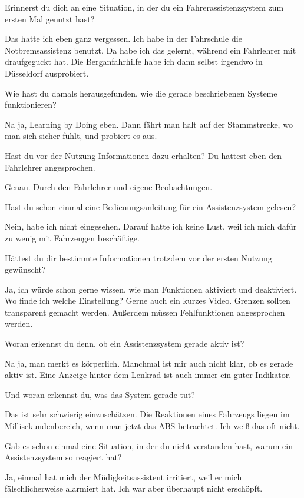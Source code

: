 \interviewerin
Erinnerst du dich an eine Situation, in der du ein
Fahrerassistenzsystem zum ersten Mal genutzt hast?

Das hatte ich eben ganz vergessen. Ich habe in der Fahrschule die
Notbremsassistenz benutzt. Da habe ich das gelernt, während ein
Fahrlehrer mit draufgeguckt hat. Die Berganfahrhilfe habe ich dann
selbst irgendwo in Düsseldorf ausprobiert.

\interviewerin
Wie hast du damals herausgefunden, wie die gerade beschriebenen Systeme
funktionieren?

Na ja, Learning by Doing eben. Dann fährt man halt auf der Stammstrecke,
wo man sich sicher fühlt, und probiert es aus.

\interviewerin
Hast du vor der Nutzung Informationen dazu erhalten? Du hattest eben
den Fahrlehrer angesprochen.

Genau. Durch den Fahrlehrer und eigene Beobachtungen.

\interviewerin
Hast du schon einmal eine Bedienungsanleitung für ein Assistenzsystem
gelesen?

Nein, habe ich nicht eingesehen. Darauf hatte ich keine Lust, weil ich
mich dafür zu wenig mit Fahrzeugen beschäftige.

\interviewerin
Hättest du dir bestimmte Informationen trotzdem vor der ersten Nutzung
gewünscht?

Ja, ich würde schon gerne wissen, wie man Funktionen aktiviert und
deaktiviert. Wo finde ich welche Einstellung? Gerne auch ein kurzes
Video. Grenzen sollten transparent gemacht werden. Außerdem müssen
Fehlfunktionen angesprochen werden.

\interviewerin
Woran erkennst du denn, ob ein Assistenzsystem gerade aktiv ist?

Na ja, man merkt es körperlich. Manchmal ist mir auch nicht klar, ob es
gerade aktiv ist. Eine Anzeige hinter dem Lenkrad ist auch immer ein
guter Indikator.

\interviewerin
Und woran erkennst du, was das System gerade tut?

Das ist sehr schwierig einzuschätzen. Die Reaktionen eines Fahrzeugs
liegen im Millisekundenbereich, wenn man jetzt das ABS betrachtet. Ich
weiß das oft nicht.

\interviewerin
Gab es schon einmal eine Situation, in der du nicht verstanden hast,
warum ein Assistenzsystem so reagiert hat?

Ja, einmal hat mich der Müdigkeitsassistent irritiert, weil er mich
fälschlicherweise alarmiert hat. Ich war aber überhaupt nicht erschöpft.

